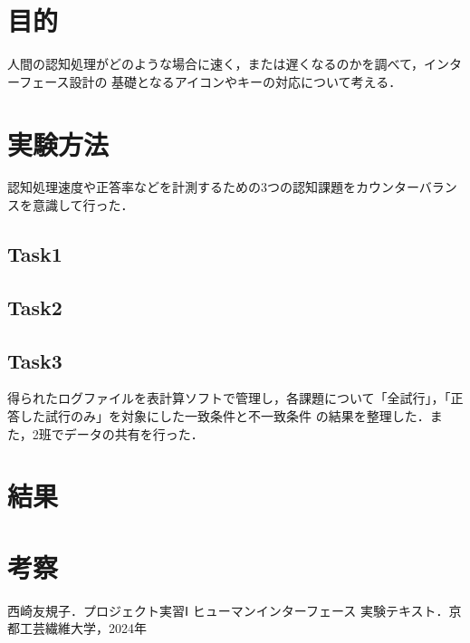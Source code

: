 \documentclass{jlreq}
\numberwithin{equation}{section}
\begin{document}
\tableofcontents
\clearpage

\section{目的}
人間の認知処理がどのような場合に速く，または遅くなるのかを調べて，インターフェース設計の
基礎となるアイコンやキーの対応について考える．


\section{実験方法}
認知処理速度や正答率などを計測するための3つの認知課題をカウンターバランスを意識して行った．

\subsection{Task1}
\subsection{Task2}
\subsection{Task3}

得られたログファイルを表計算ソフトで管理し，各課題について「全試行」，「正答した試行のみ」を対象にした一致条件と不一致条件
の結果を整理した．また，2班でデータの共有を行った．

\section{結果}

\section{考察}

\begin{thebibliography}{9}
  \item 西崎友規子．プロジェクト実習Ⅰ ヒューマンインターフェース 実験テキスト．京都工芸繊維大学，2024年
\end{thebibliography}
\end{document}
